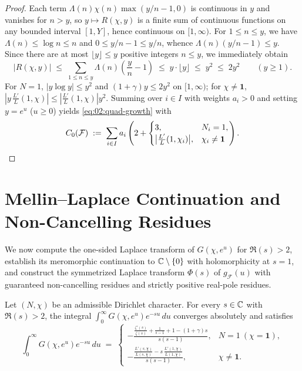 \begin{proof}
Each term $\Lambda(n)\chi(n)\max(y/n - 1, 0)$ is continuous in $y$ and vanishes for $n > y$, so $y \mapsto R(\chi, y)$ is a finite sum of continuous functions on any bounded interval $[1, Y]$, hence continuous on $[1,\infty)$. For $1 \le n \le y$, we have $\Lambda(n) \le \log n \le n$ and $0 \le y/n - 1 \le y/n$, whence $\Lambda(n)(y/n - 1) \le y$. Since there are at most $\lfloor y \rfloor \le y$ positive integers $n \le y$, we immediately obtain
\[
  |R(\chi, y)| \;\le\; \sum_{1 \le n \le y} \Lambda(n)\!\left(\frac{y}{n} - 1\right) \;\le\; y \cdot \lfloor y \rfloor \;\le\; y^2 \;\le\; 2y^2 \qquad (y \ge 1).
\]
For $N = 1$, $|y\log y| \le y^2$ and $(1+\gamma)y \le 2y^2$ on $[1, \infty)$; for $\chi \neq \mathbf{1}$, $|y\,\frac{L'}{L}(1,\chi)| \le |\frac{L'}{L}(1,\chi)| y^2$. Summing over $i \in I$ with weights $a_i > 0$ and setting $y = e^u$ ($u \ge 0$) yields \eqref{eq:02:quad-growth} with
\[
  C_0(\mathcal{F}) \;:=\; \sum_{i \in I} a_i \left(2 + \begin{cases} 3, & N_i = 1, \\ \bigl|\frac{L'}{L}(1,\chi_i)\bigr|, & \chi_i \neq \mathbf{1} \end{cases}\right). \qedhere
\]
\end{proof}

\section{Mellin--Laplace Continuation and Non-Cancelling Residues}
\label{sec:02:laplace}

We now compute the one-sided Laplace transform of $G(\chi, e^u)$ for $\Re(s) > 2$, establish its meromorphic continuation to $\mathbb{C} \setminus \{0\}$ with holomorphicity at $s = 1$, and construct the symmetrized Laplace transform $\Phi(s)$ of $g_{\mathcal{F}}(u)$ with guaranteed non-cancelling residues and strictly positive real-pole residues.

\begin{lemma}
\label{lem:02:mellin-ramp}
Let $(N, \chi)$ be an admissible Dirichlet character. For every $s \in \mathbb{C}$ with $\Re(s) > 2$, the integral $\int_0^\infty G(\chi, e^u) e^{-su}\,du$ converges absolutely and satisfies
\begin{equation}
\label{eq:02:mellin-id}
  \int_0^\infty G(\chi, e^u) e^{-su}\,du \;=\;
  \begin{cases}
    \displaystyle -\frac{\frac{\zeta'(s)}{\zeta(s)} + \frac{1}{s-1} + 1 - (1+\gamma)s}{s(s-1)}, & N = 1\ (\chi = \mathbf{1}), \\[12pt]
    \displaystyle -\frac{\frac{L'(s,\chi)}{L(s,\chi)} - s\,\frac{L'(1,\chi)}{L(1,\chi)}}{s(s-1)}, & \chi \neq \mathbf{1}.
  \end{cases}
\end{equation}
\end{lemma}

